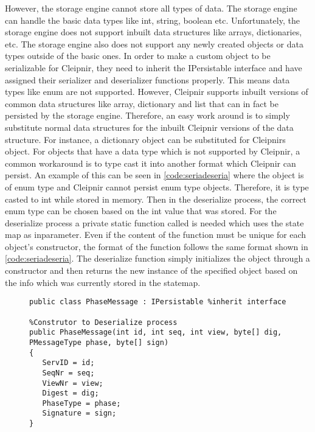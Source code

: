 However, the storage engine cannot store all types of data. The storage engine can handle the basic data types like int, string, boolean etc. Unfortunately, the storage engine does not support inbuilt data structures like arrays, dictionaries, etc. The storage engine also does not support any newly created objects or data types outside of the basic ones. In order to make a custom object to be serializable for Cleipnir, they need to inherit the IPersistable interface and have assigned their serializer and deserializer functions properly. This means data types like enum are not supported. However, Cleipnir supports inbuilt versions of common data structures like array, dictionary and list that can in fact be persisted by the storage engine. Therefore, an easy work around is to simply substitute normal data structures for the inbuilt Cleipnir versions of the data structure. For instance, a dictionary object can be substituted for Cleipnirs  object. For objects that have a data type which is not supported by Cleipnir, a common workaround is to type cast it into another format which Cleipnir can persist. An example of this can be seen in \autoref{code:seriadeseria} where the object  is of enum type and Cleipnir cannot persist enum type objects. Therefore, it is type casted to int while stored in memory. Then in the deserialize process, the correct enum type can be chosen based on the int value that was stored. For the deserialize process a private static function called  is needed which uses the state map as inparameter. Even if the content of the function must be unique for each object’s constructor, the format of the function follows the same format shown in \autoref{code:seriadeseria}. The deserialize function simply initializes the object through a constructor and then returns the new instance of the specified object based on the info which was currently stored in the statemap.

\begin{figure}[H]
	\centering
	\begin{lstlisting}[label = code:interfaceexample, caption=Persistent initialize process, captionpos=b, basicstyle=\scriptsize]
public class PhaseMessage : IPersistable %inherit interface
		
%Construtor to Deserialize process
public PhaseMessage(int id, int seq, int view, byte[] dig, PMessageType phase, byte[] sign)
{
   ServID = id;
   SeqNr = seq;
   ViewNr = view;
   Digest = dig;
   PhaseType = phase;
   Signature = sign;
}
	\end{lstlisting}
\end{figure}

